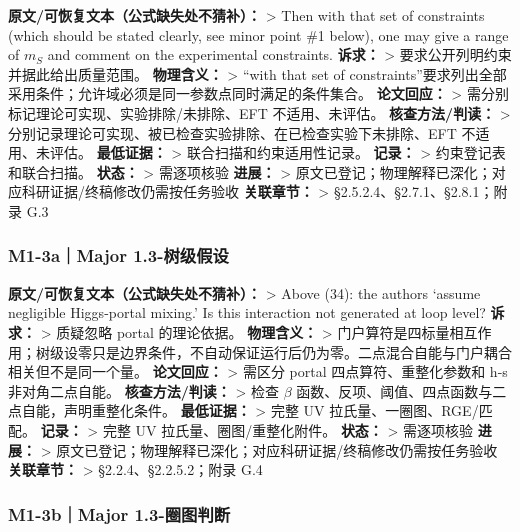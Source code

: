 \documentclass[
  chinese,
  UTF8]{ctexart}
\begin{document}
\textbf{原文/可恢复文本（公式缺失处不猜补）：} \textgreater{} Then with
that set of constraints (which should be stated clearly, see minor point
\#1 below), one may give a range of \(m_S\) and comment on the
experimental constraints. \textbf{诉求：} \textgreater{}
要求公开列明约束并据此给出质量范围。 \textbf{物理含义：} \textgreater{}
``with that set of
constraints''要求列出全部采用条件；允许域必须是同一参数点同时满足的条件集合。
\textbf{论文回应：} \textgreater{}
需分别标记理论可实现、实验排除/未排除、EFT 不适用、未评估。
\textbf{核查方法/判读：} \textgreater{}
分别记录理论可实现、被已检查实验排除、在已检查实验下未排除、EFT
不适用、未评估。 \textbf{最低证据：} \textgreater{}
联合扫描和约束适用性记录。 \textbf{记录：} \textgreater{}
约束登记表和联合扫描。 \textbf{状态：} \textgreater{} 需逐项核验
\textbf{进展：} \textgreater{}
原文已登记；物理解释已深化；对应科研证据/终稿修改仍需按任务验收
\textbf{关联章节：} \textgreater{} §2.5.2.4、§2.7.1、§2.8.1；附录 G.3

\subsubsection{M1-3a｜Major
1.3-树级假设}\label{m1-3amajor-1.3-ux6811ux7ea7ux5047ux8bbe}

\textbf{原文/可恢复文本（公式缺失处不猜补）：} \textgreater{} Above
(34): the authors `assume negligible Higgs-portal mixing.' Is this
interaction not generated at loop level? \textbf{诉求：} \textgreater{}
质疑忽略 portal 的理论依据。 \textbf{物理含义：} \textgreater{}
门户算符是四标量相互作用；树级设零只是边界条件，不自动保证运行后仍为零。二点混合自能与门户耦合相关但不是同一个量。
\textbf{论文回应：} \textgreater{} 需区分 portal 四点算符、重整化参数和
h-s 非对角二点自能。 \textbf{核查方法/判读：} \textgreater{} 检查
\ensuremath{\beta}
函数、反项、阈值、四点函数与二点自能，声明重整化条件。
\textbf{最低证据：} \textgreater{} 完整 UV 拉氏量、一圈图、RGE/匹配。
\textbf{记录：} \textgreater{} 完整 UV 拉氏量、圈图/重整化附件。
\textbf{状态：} \textgreater{} 需逐项核验 \textbf{进展：} \textgreater{}
原文已登记；物理解释已深化；对应科研证据/终稿修改仍需按任务验收
\textbf{关联章节：} \textgreater{} §2.2.4、§2.2.5.2；附录 G.4

\subsubsection{M1-3b｜Major
1.3-圈图判断}\label{m1-3bmajor-1.3-ux5708ux56feux5224ux65ad}
\end{document}
